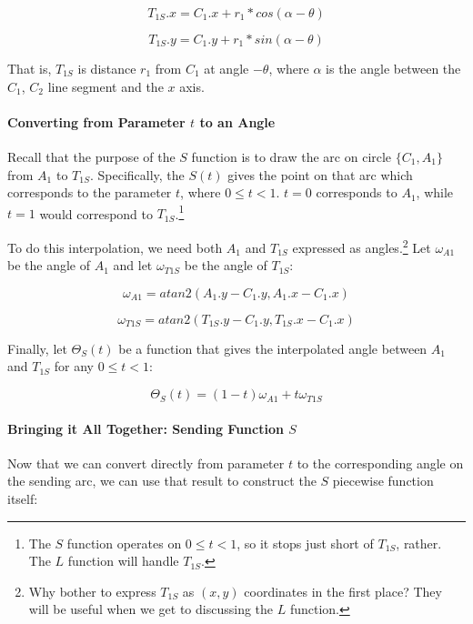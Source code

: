 \documentclass{article}
\begin{document}
\begin{equation}
    \label{eq:T_1S.x}
    T_{1S}.x = C_1.x + r_1 * cos(\alpha - \theta)
\end{equation}

\begin{equation}
    \label{eq:T_1S.y}
    T_{1S}.y = C_1.y + r_1 * sin(\alpha - \theta)
\end{equation}

That is, $T_{1S}$ is distance $r_1$ from $C_1$ at angle $-\theta$, where $\alpha$ is the angle between the $C_1$, $C_2$ line segment and the $x$ axis.

\paragraph{Converting from Parameter $t$ to an Angle}
Recall that the purpose of the $S$ function is to draw the arc on  circle $\{C_1, A_1\}$ from $A_1$ to $T_{1S}$. Specifically, the $S(t)$ gives the point on that arc which corresponds to the parameter $t$, where $0 \leq t < 1$. $t = 0$ corresponds to $A_1$, while $t = 1$ would correspond to $T_{1S}$.\footnote{The $S$ function operates on $0 \leq t < 1$, so it stops just short of $T_{1S}$, rather. The $L$ function will handle $T_{1S}$.}

To do this interpolation, we need both $A_1$ and $T_{1S}$ expressed as angles.\footnote{Why bother to express $T_{1S}$ as $(x,y)$ coordinates in the first place? They will be useful when we get to discussing the $L$ function.} Let $\omega_{A1}$ be the angle of $A_1$ and let $\omega_{T1S}$ be the angle of $T_{1S}$:

\begin{equation}
    \label{eq:omega_A1}
    \omega_{A1} = atan2(A_1.y - C_1.y, A_1.x - C_1.x)
\end{equation}

\begin{equation}
    \label{eq:omega_T1S}
    \omega_{T1S} = atan2(T_{1S}.y - C_1.y, T_{1S}.x - C_1.x)
\end{equation}

Finally, let $\Theta_S(t)$ be a function that gives the interpolated angle between $A_1$ and $T_{1S}$ for any $0 \leq t < 1$:

\begin{equation}
    \label{eq:Theta_S(t)}
    \Theta_S(t) = (1-t) \omega_{A1} + t \omega_{T1S}
\end{equation}

\paragraph{Bringing it All Together: Sending Function $S$}
Now that we can convert directly from parameter $t$ to the corresponding angle on the sending arc, we can use that result to construct the $S$ piecewise function itself:
\end{document}
